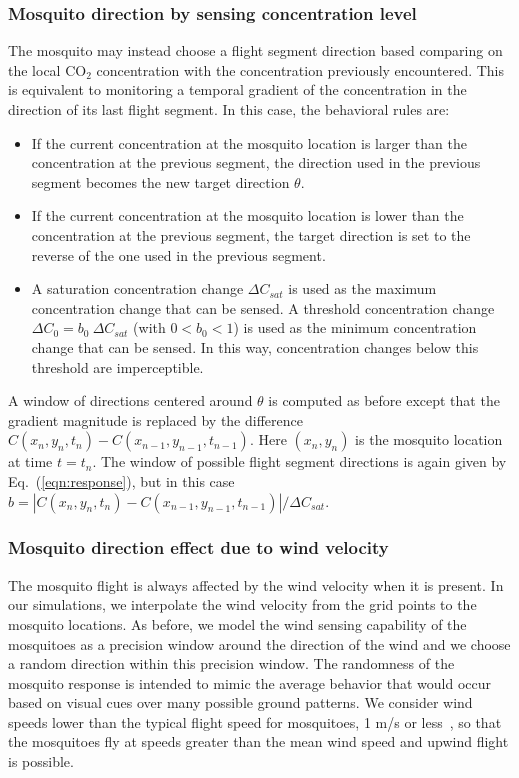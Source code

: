 \documentclass[12pt]{article}
\begin{document}
\subsubsection{Mosquito direction by sensing concentration level}
The mosquito may instead choose a flight segment direction based comparing on the local CO$_2$ concentration with the concentration previously encountered. This is equivalent to monitoring a temporal gradient of the concentration in the direction of its last flight segment.  In this case, the behavioral rules are:
\begin{itemize}
\item
If the current concentration at the mosquito location is larger than the
concentration at the previous segment, the direction used in the previous segment becomes the new target direction
$\theta$.
\item
If the current concentration at the mosquito location is lower than the
concentration at the previous segment, the target direction is set to the reverse of the one used in the previous segment.
\item
A saturation concentration change $\Delta C_{sat}$ is used as the maximum concentration
change that can be sensed.  A threshold concentration change $\Delta C_0 = b_0\ \Delta C_{sat}$
(with $0<b_0<1$) is used as the minimum concentration change that can be sensed.  In this way, concentration changes below this threshold are imperceptible.
\end{itemize}
A window of directions centered around $\theta$ is computed as before except that the gradient
magnitude is replaced by the difference $C(x_n,y_n,t_n)-C(x_{n-1},y_{n-1},t_{n-1})$. Here $(x_n,y_n)$ is the mosquito location at time $t=t_n$. The window of possible flight segment directions is again given by Eq.~(\ref{eqn:response}), but in this case $b = |C(x_n,y_n,t_n)-C(x_{n-1},y_{n-1},t_{n-1})|/\Delta C_{sat}$.
	
\subsubsection{Mosquito direction effect due to wind velocity}
The mosquito flight is always affected by the wind velocity when it is present. In our simulations, we interpolate the wind velocity from the grid points to the mosquito locations.
As before, we model the wind sensing capability of the mosquitoes as a precision window around the direction of the wind and we choose a random direction within this precision window.  The randomness of the mosquito response is intended to mimic the average behavior that would occur based on visual cues over many possible ground patterns. We consider wind speeds lower than the typical flight speed for mosquitoes, 1 m/s or less~\cite{Clements1999}, so that the mosquitoes fly at speeds greater than the mean wind speed and upwind flight is possible. 	
\end{document}
